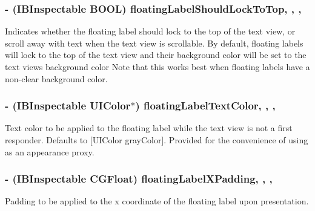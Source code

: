 \subsubsection[{floating\+Label\+Should\+Lock\+To\+Top}]{\setlength{\rightskip}{0pt plus 5cm}-\/ (I\+B\+Inspectable B\+O\+O\+L) floating\+Label\+Should\+Lock\+To\+Top\hspace{0.3cm}{\ttfamily [read]}, {\ttfamily [write]}, {\ttfamily [nonatomic]}, {\ttfamily [assign]}}\label{interface_j_v_float_labeled_text_view_a62884c0e053aaf577df9c10b111d164e}
Indicates whether the floating label should lock to the top of the text view, or scroll away with text when the text view is scrollable. By default, floating labels will lock to the top of the text view and their background color will be set to the text view\textquotesingle{}s background color Note that this works best when floating labels have a non-\/clear background color. \hypertarget{interface_j_v_float_labeled_text_view_a037211938698f45a06a31d0c492e5632}{}
\subsubsection[{floating\+Label\+Text\+Color}]{\setlength{\rightskip}{0pt plus 5cm}-\/ (I\+B\+Inspectable U\+I\+Color$\ast$) floating\+Label\+Text\+Color\hspace{0.3cm}{\ttfamily [read]}, {\ttfamily [write]}, {\ttfamily [nonatomic]}, {\ttfamily [strong]}}\label{interface_j_v_float_labeled_text_view_a037211938698f45a06a31d0c492e5632}
Text color to be applied to the floating label while the text view is not a first responder. Defaults to {\ttfamily \mbox{[}U\+I\+Color gray\+Color\mbox{]}}. Provided for the convenience of using as an appearance proxy. \hypertarget{interface_j_v_float_labeled_text_view_a856de4f1de19833103a41b1f733f235b}{}
\subsubsection[{floating\+Label\+X\+Padding}]{\setlength{\rightskip}{0pt plus 5cm}-\/ (I\+B\+Inspectable C\+G\+Float) floating\+Label\+X\+Padding\hspace{0.3cm}{\ttfamily [read]}, {\ttfamily [write]}, {\ttfamily [nonatomic]}, {\ttfamily [assign]}}\label{interface_j_v_float_labeled_text_view_a856de4f1de19833103a41b1f733f235b}
Padding to be applied to the x coordinate of the floating label upon presentation. \hypertarget{interface_j_v_float_labeled_text_view_a407df8e8312fa50a95182e1b69360257}{}
